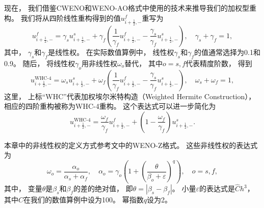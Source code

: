 现在，
我们借鉴CWENO和WENO-AO格式中使用的技术来推导我们的加权型重构。
我们将从四阶线性重构得到的值$u_{i+\frac{1}{2},-}^{{f}}$重写为
\begin{equation}
  u_{i+\frac{1}{2},-}^{{f}}= \gamma_{{s}}u_{i+\frac{1}{2},-}^{{s}}+ \gamma_{{f}}\left(\frac{1}{\gamma_{{f}}}u_{i+\frac{1}{2},-}^{{f}}-\frac{\gamma_{{s}}}{\gamma_{{f}}}u_{i+\frac{1}{2},-}^{{s}}\right), \quad \gamma_{{s}}+ \gamma_{{f}}=1,
\end{equation}
其中，
$\gamma_{{s}}$和$\gamma_{{f}}$是线性权。
在实际数值算例中，
线性权$\gamma_{{s}}$和$\gamma_{{f}}$的值通常选择为0.1和0.9。
随后，
将线性权$\gamma_{{o}}$用非线性权$\omega_{{o}}$替代，
其中${{o}}={{s}}, {{f}}$代表精度阶数，
得到
\begin{equation}
  u_{i+\frac{1}{2},-}^{\text{WHC-4}}= \omega_{{s}}u_{i+\frac{1}{2},-}^{{s}}+ \omega_{{f}}\left(\frac{1}{\gamma_{{f}}}u_{i+\frac{1}{2},-}^{{f}}-\frac{\gamma_{{s}}}{\gamma_{{f}}}u_{i+\frac{1}{2},-}^{{s}}\right), \quad \omega_{{s}}+\omega_{{f}}=1,
\end{equation}
这里，
上标“WHC”代表加权埃尔米特构造（Weighted Hermite Construction），
相应的四阶重构被称为WHC-4重构。
这个表达式可以进一步简化为
\begin{equation}
  \label{eq:1D-WHC4}
  u_{i+\frac{1}{2},-}^{\text{WHC-4}}= \frac{\omega_{{f}}}{\gamma_{{f}}}u_{i+\frac{1}{2},-}^{{f}}+ \left(1-\frac{\omega_{{f}}}{\gamma_{{f}}}\right)u_{i+\frac{1}{2},-}^{{s}}.
\end{equation}

本章中的非线性权的定义方式参考文\cite{WENO_Z}中的WENO-Z格式。
这些非线性权的表达式为
\begin{equation}
  \label{eq:1D-nonlinearweight}
  \omega_{{o}}=\frac{\alpha_{{o}}}{\alpha_{{s}}+\alpha_{{f}}}, \quad
  \alpha_{{o}}=\gamma_{{o}}\left( 1+\left( \frac{\theta}{\beta_{{o}}+\varepsilon}\right)^q \right) , \quad {{o}}={{s}}, {{f}},
\end{equation}
其中，
变量$\theta$是$\beta_{{s}}$和$\beta_{{f}}$的差的绝对值，
即$\theta = |\beta_{{s}}-\beta_{{f}}|$。
小量$\varepsilon$的表达式是$\widehat{C}h^3$，
其中$\widehat{C}$在我们的数值算例中设为100。
幂指数$q$设为2。

